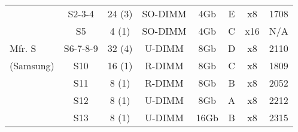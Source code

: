 \begin{table}[ht!]
{\begin{tabular}{l|ccccccc}
               & S2-3-4   & 24 (3) &        SO-DIMM       &      4Gb  & E   &   x8   &   1708   \\  
               & S5   & 4 (1) &        SO-DIMM       &      4Gb  & C   &   x16   &   N/A   \\  
    Mfr. S     & S6-7-8-9   & 32 (4) &        U-DIMM       &      8Gb  & D   &   x8   &   2110   \\  
    (Samsung)  & S10   & 16 (1) &        R-DIMM       &      8Gb  & C   &   x8   &   1809   \\  
               & S11   & 8 (1) &        R-DIMM       &      8Gb  & B   &   x8   &   2052   \\  
               & S12   & 8 (1) &        U-DIMM       &      8Gb  & A   &   x8   &   2212   \\  
               & S13   & 8 (1) &        U-DIMM       &      16Gb  & B   &   x8   &   2315   \\                
        \hline
    \end{tabular}
    \label{tab:dram_chip_list}
    }
\end{table}



